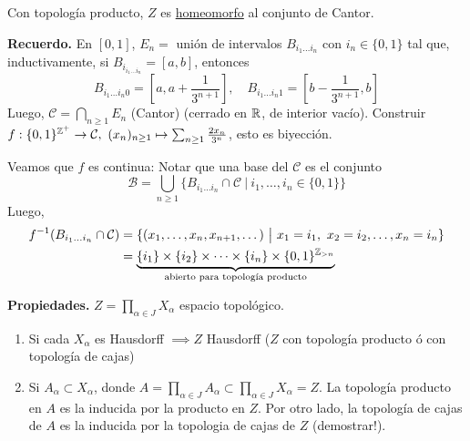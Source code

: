 \documentclass[a4paper]{report}
\begin{document}
\noindent Con topología producto, $Z$ es \underline{homeomorfo} al conjunto de Cantor.\newline

\noindent \textbf{Recuerdo.} En $[0,1]$, $E_n =$ unión de intervalos $B_{i_1 \dots i_n}$ con $i_n \in \{0,1\}$ tal que, inductivamente, si $B_{i_{i_1\dots i_n}} = [a,b]$, entonces 
\[B_{i_1\dots i_n 0} = \left[ a, a+\frac{1}{3^{n+1}} \right],\quad B_{i_1\dots i_n 1} = \left[ b-\frac{1}{3^{n+1}}, b \right] \]
\noindent Luego, $\mathcal{C} = \bigcap_{n\geq 1} E_n$ (Cantor) (cerrado en $\mathbb{R}$, de interior vacío). Construir $f: \{0,1\}^{\mathbb{Z}^+} \to \mathcal{C},\ (x_n)_{n\geq 1} \mapsto \sum_{n\geq 1} \frac{2 x_n}{3^n}$, esto es biyección.\newline

\noindent Veamos que $f$ es continua: Notar que una base del $\mathcal{C}$ es el conjunto
\[ \mathcal{B} = \bigcup_{n \geq 1} \{B_{i_1\dots i_n} \cap \mathcal{C} \ \big| \ i_1,\dots,i_n \in \{0,1\}  \} \] 
Luego, 
\begin{align*}
	f^{-1}(B_{i_1\dots i_n} \cap \mathcal{C}) & = \{ (x_1,\dots,x_n,x_{n+1},\dots) \ \big| \ x_1 = i_1,\ x_2 = i_2, \dots, x_n = i_n \} \\
	& = \underbrace{\{i_1\} \times \{i_2\} \times \cdots \times \{i_n\} \times \{0,1\}^{\mathbb{Z}_{>n}}}_{\text{abierto para topología producto}}
\end{align*}

\noindent \textbf{Propiedades.} $Z = \prod_{\alpha \in J} X_{\alpha}$ espacio topológico.
\begin{enumerate}
	\item Si cada $X_{\alpha}$ es Hausdorff $\implies Z$ Hausdorff ($Z$ con topología producto ó con topología de cajas)

	\item Si $A_{\alpha} \subset X_{\alpha}$, donde $A = \prod_{\alpha \in J} A_{\alpha} \subset \prod_{\alpha \in J} X_{\alpha} = Z$. La topología producto en $A$ es la inducida por la producto en $Z$. Por otro lado, la topología de cajas de $A$ es la inducida por la topologia de cajas de $Z$ (demostrar!).
\end{enumerate}






\end{document}
